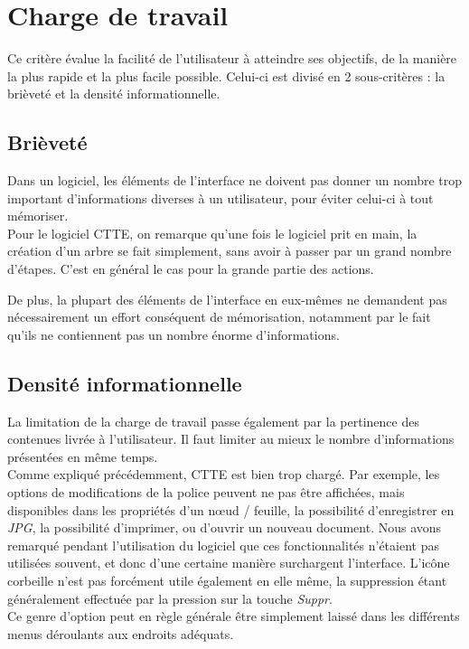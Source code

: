 \documentclass[12pt, a4paper]{article}
\begin{document}
\section{Charge de travail}
Ce critère évalue la facilité de l'utilisateur à atteindre ses objectifs, de la manière la plus rapide et la plus facile possible. Celui-ci est divisé en 2 sous-critères : la brièveté et la densité informationnelle.

\subsection{Brièveté}
Dans un logiciel, les éléments de l'interface ne doivent pas donner un nombre trop important d'informations diverses à un utilisateur, pour éviter celui-ci à tout mémoriser.\\


Pour le logiciel CTTE, on remarque qu'une fois le logiciel prit en main, la création d'un arbre se fait simplement, sans avoir à passer par un grand nombre d'étapes. C'est en général le cas pour la grande partie des actions. 


De plus, la plupart des éléments de l'interface en eux-mêmes ne demandent pas nécessairement un effort conséquent de mémorisation, notamment par le fait qu'ils ne contiennent pas un nombre énorme d'informations.

\subsection{Densité informationnelle}
La limitation de la charge de travail passe également par la pertinence des contenues livrée à l'utilisateur. Il faut limiter au mieux le nombre d'informations présentées en même temps.\\


Comme expliqué précédemment, CTTE est bien trop chargé. Par exemple, les options de modifications de la police peuvent ne pas être affichées, mais disponibles dans les propriétés d'un nœud / feuille, la possibilité d'enregistrer en \emph{JPG}, la possibilité d'imprimer, ou d'ouvrir un nouveau document. Nous avons remarqué pendant l'utilisation du logiciel que ces fonctionnalités n'étaient pas utilisées souvent, et donc d'une certaine manière surchargent l'interface. L'icône corbeille n'est pas forcément utile également en elle même, la suppression étant généralement effectuée par la pression sur la touche \emph{Suppr}. \\


Ce genre d'option peut en règle générale être simplement laissé dans les différents menus déroulants aux endroits adéquats.
\end{document}
